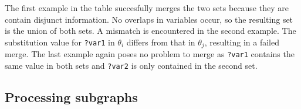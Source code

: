 \noindent The first example in the table succesfully merges the two sets because they are contain disjunct information. No overlaps in variables occur, so the resulting set is the union of both sets. A mismatch is encountered in the second example. The substitution value for \texttt{?var1} in $\theta_i$ differs from that in $\theta_j$, resulting in a failed merge. The last example again poses no problem to merge as \texttt{?var1} contains the same value in both sets and \texttt{?var2} is only contained in the second set.


\subsection{Processing subgraphs}
\label{subsec:subgraphs}





